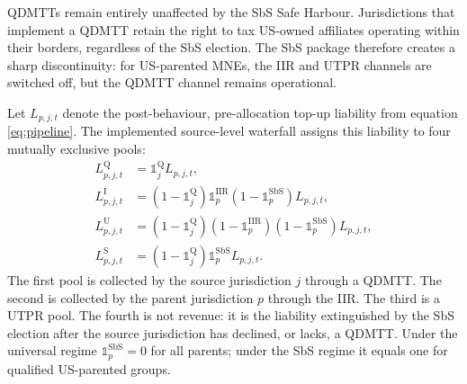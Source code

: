 \documentclass[11pt,a4paper]{article}
\begin{document}
QDMTTs remain entirely unaffected by the SbS Safe Harbour. Jurisdictions that implement a QDMTT retain the right to tax US-owned affiliates operating within their borders, regardless of the SbS election. The SbS package therefore creates a sharp discontinuity: for US-parented MNEs, the IIR and UTPR channels are switched off, but the QDMTT channel remains operational. 


Let $L_{p,j,t}$ denote the post-behaviour, pre-allocation top-up liability from equation \eqref{eq:pipeline}. The implemented source-level waterfall assigns this liability to four mutually exclusive pools:
\begin{align}
L_{p,j,t}^{\text{Q}} &= \mathbb{1}_j^{\text{Q}} L_{p,j,t}, \label{eq:qdmtt_sbs} \\
L_{p,j,t}^{\text{I}} &= (1-\mathbb{1}_j^{\text{Q}})\mathbb{1}_p^{\text{IIR}}(1-\mathbb{1}_p^{\text{SbS}})L_{p,j,t}, \label{eq:iir_sbs} \\
L_{p,j,t}^{\text{U}} &= (1-\mathbb{1}_j^{\text{Q}})(1-\mathbb{1}_p^{\text{IIR}})(1-\mathbb{1}_p^{\text{SbS}})L_{p,j,t}, \label{eq:utpr_sbs} \\
L_{p,j,t}^{\text{S}} &= (1-\mathbb{1}_j^{\text{Q}})\mathbb{1}_p^{\text{SbS}}L_{p,j,t}. \label{eq:sbs_extinguish}
\end{align}
The first pool is collected by the source jurisdiction $j$ through a QDMTT. The second is collected by the parent jurisdiction $p$ through the IIR. The third is a UTPR pool. The fourth is not revenue: it is the liability extinguished by the SbS election after the source jurisdiction has declined, or lacks, a QDMTT. Under the universal regime $\mathbb{1}_p^{\text{SbS}}=0$ for all parents; under the SbS regime it equals one for qualified US-parented groups.
\end{document}
